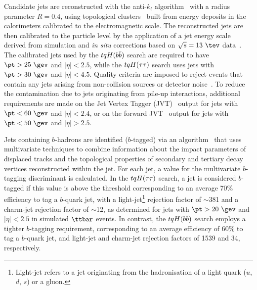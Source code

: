 Candidate jets are reconstructed with the anti-$k_t$ algorithm~\cite{Cacciari:2008gp,Cacciari:2005hq,Cacciari:2011ma} with a
radius parameter $R=0.4$, using topological clusters~\cite{Aad:2016upy} 
built from energy deposits in the calorimeters calibrated to the electromagnetic scale. 
The reconstructed jets are then calibrated to the particle level by the application of a jet energy scale 
derived from simulation and {\textit{in situ}} corrections based on $\sqrt{s}=13~\tev$ data~\cite{Aaboud:2017jcu}.
The calibrated jets used by the $tqH(b\bar{b})$ search are required to have $\pt > 25~\gev$ and $|\eta| < 2.5$,
while the $tqH(\tau\tau)$ search uses jets with $\pt > 30~\gev$ and $|\eta| < 4.5$.
Quality criteria are imposed to reject events that contain any jets arising from non-collision sources
or detector noise~\cite{ATLAS-CONF-2015-029}.  To reduce the contamination due to jets originating from pile-up interactions,
additional requirements are made on the Jet Vertex Tagger (JVT)~\cite{Aad:2015ina} output for jets with $\pt<60~\gev$ and $|\eta| < 2.4$,
or on the forward JVT~\cite{Aaboud:2017pou} output for jets with $\pt<50~\gev$ and $|\eta| > 2.5$.

Jets containing $b$-hadrons are identified ($b$-tagged) via an algorithm~\cite{Aad:2015ydr,ATL-PHYS-PUB-2016-012} 
that uses multivariate techniques to combine information about the impact parameters of displaced tracks and the  topological properties 
of secondary and tertiary decay vertices reconstructed within the jet. For each jet, a value for the multivariate $b$-tagging discriminant is 
calculated. In the $tqH(\tau\tau)$ search, a jet is considered $b$-tagged if this value is above the threshold corresponding to
an average 70\% efficiency to tag a $b$-quark jet, with a light-jet\footnote{Light-jet refers to a jet originating from the hadronisation of a light quark 
($u$, $d$, $s$) or a gluon.} rejection factor of $\sim$381 and a charm-jet rejection factor of $\sim$12, as determined for jets with
$\pt >20~\gev$ and $|\eta|<2.5$ in simulated $\ttbar$ events. In contrast, the $tqH(b\bar{b})$ search employs a tighter $b$-tagging requirement, 
corresponding to an average efficiency of 60\% to tag a $b$-quark jet, and light-jet and charm-jet rejection factors of 1539 and 34, respectively.

